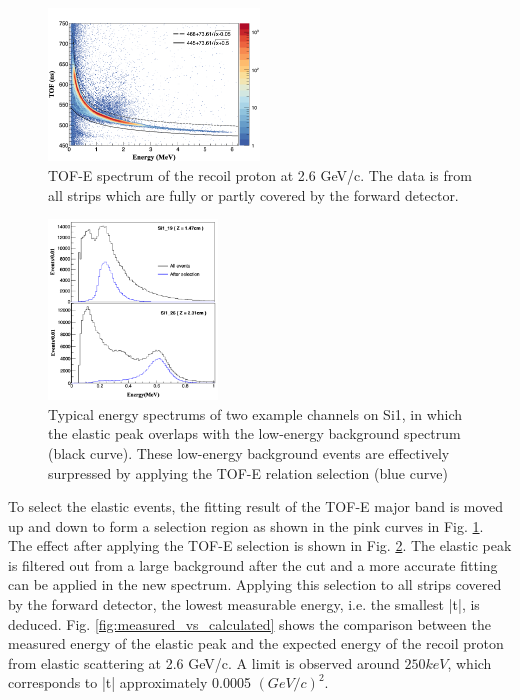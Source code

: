 \documentclass[number,5p]{elsarticle}
\begin{document}
\begin{figure}[htbp]
  \centering
  \includegraphics[width=0.5\textwidth]{./tof_e_cut.png}
  \caption{
    TOF-E spectrum of the recoil proton at 2.6 GeV/c. The data is from all strips which are fully or partly covered by the forward detector.}
  \label{fig:tof-e}
\end{figure}

\begin{figure}[htbp]
  \centering
  \includegraphics[width=0.4\textwidth]{./comparison_tof_e_cut.png}
  \caption{Typical energy spectrums of two example channels on Si1, in which the elastic peak overlaps with the low-energy background spectrum (black curve). These low-energy background events are effectively surpressed by applying the TOF-E relation selection (blue curve)}
  \label{fig:cut}
\end{figure}

To select the elastic events, the fitting result of the TOF-E major band is moved up and down to form a selection region as shown in the pink curves in Fig. \ref{fig:tof-e}.
The effect after applying the TOF-E selection is shown in Fig. \ref{fig:cut}.
The elastic peak is filtered out from a large background after the cut and a more accurate fitting can be applied in the new spectrum.
Applying this selection to all strips covered by the forward detector, the lowest measurable energy, i.e. the smallest |t|, is deduced.
Fig. \ref{fig:measured_vs_calculated} shows the comparison between the measured
energy of the elastic peak and the expected energy of the recoil proton from elastic scattering at 2.6 GeV/c.
A limit is observed around \(250 keV\), which corresponds to |t| approximately 0.0005 \((GeV/c)^2\).
\end{document}
